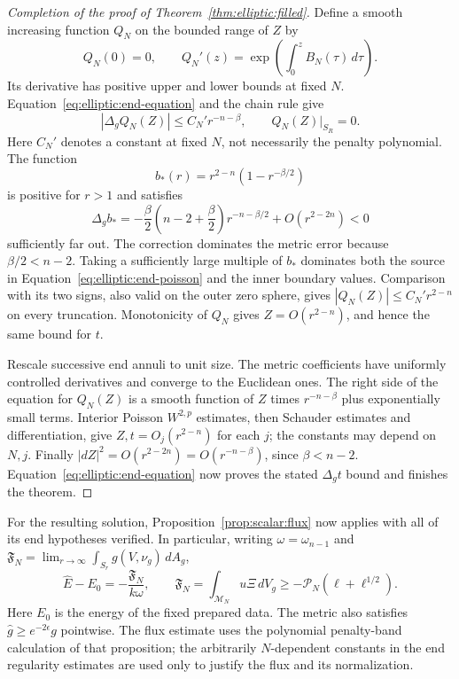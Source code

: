 \begin{proof}[Completion of the proof of Theorem~\ref{thm:elliptic:filled}]
Define a smooth increasing function $Q_N$ on the bounded range of $Z$
by
\[
 Q_N(0)=0,\qquad Q_N'(z)
 =\exp\left(\int_0^z B_N(\tau)\,d\tau\right).
\]
Its derivative has positive upper and lower bounds at fixed $N$.
Equation~\eqref{eq:elliptic:end-equation} and the chain rule give
\begin{equation}\label{eq:elliptic:end-poisson}
 |\Delta_g Q_N(Z)|\le C_N' r^{-n-\beta},
 \qquad Q_N(Z)|_{S_R}=0.
\end{equation}
Here $C_N'$ denotes a constant at fixed $N$, not necessarily the
penalty polynomial.  The function
\[
 b_*(r)=r^{2-n}(1-r^{-\beta/2})
\]
is positive for $r>1$ and satisfies
\[
 \Delta_g b_*
 =-\frac\beta2\left(n-2+\frac\beta2\right)r^{-n-\beta/2}
          +O(r^{2-2n})<0
\]
sufficiently far out.  The correction dominates the metric error
because $\beta/2<n-2$.
Taking a sufficiently large multiple of $b_*$ dominates both the
source in Equation~\eqref{eq:elliptic:end-poisson} and the inner
boundary values.  Comparison with its two signs, also valid on the
outer zero sphere, gives
$|Q_N(Z)|\le C_N' r^{2-n}$ on every truncation.  Monotonicity of $Q_N$
gives $Z=O(r^{2-n})$, and hence the same bound for $t$.

Rescale successive end annuli to unit size.  The metric coefficients
have uniformly controlled derivatives and converge to the Euclidean
ones.  The right side of the equation for $Q_N(Z)$ is a smooth
function of $Z$ times $r^{-n-\beta}$ plus exponentially small terms.
Interior Poisson $W^{2,p}$ estimates, then Schauder estimates and
differentiation, give $Z,t=O_j(r^{2-n})$ for each $j$; the constants
may depend on $N,j$.  Finally
$|dZ|^2=O(r^{2-2n})=O(r^{-n-\beta})$, since $\beta<n-2$.
Equation~\eqref{eq:elliptic:end-equation} now proves the stated
$\Delta_g t$ bound and finishes the theorem.
\end{proof}

For the resulting solution, Proposition~\ref{prop:scalar:flux} now
applies with all of its end hypotheses verified.  In particular,
writing $\omega=\omega_{n-1}$ and
$\mathfrak F_N=\lim_{r\to\infty}\int_{S_r}g(V,\nu_g)\,dA_g$,
\begin{equation}\label{eq:elliptic:constructed-energy}
 \widehat E-E_0=-\frac{\mathfrak F_N}{k\omega},\qquad
 \mathfrak F_N=\int_{\mathcal M_N}u\Xi\,dV_g
       \ge-\mathcal P_N(\ell+\ell^{1/2}).
\end{equation}
Here $E_0$ is the energy of the fixed prepared data.  The metric also
satisfies $\widehat g\ge e^{-2\epsilon}g$ pointwise.  The flux estimate
uses the polynomial penalty-band calculation of that proposition;
the arbitrarily $N$-dependent constants in the end regularity estimates
are used only to justify the flux and its normalization.

